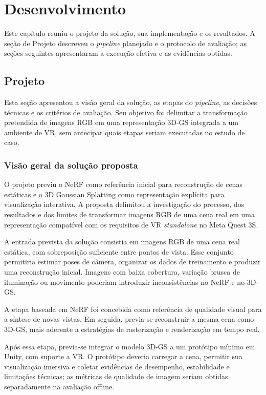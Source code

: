 \chapter[Desenvolvimento]{Desenvolvimento}

Este capítulo reuniu o projeto da solução, sua implementação e os resultados. A seção de Projeto descreveu o \textit{pipeline} planejado e o protocolo de avaliação; as seções seguintes apresentaram a execução efetiva e as evidências obtidas.

\section{Projeto}

Esta seção apresentou a visão geral da solução, as etapas do \textit{pipeline}, as decisões técnicas e os critérios de avaliação. Seu objetivo foi delimitar a transformação pretendida de imagens RGB em uma representação 3D-GS integrada a um ambiente de VR, sem antecipar quais etapas seriam executadas no estudo de caso.

\subsection{Visão geral da solução proposta}

O projeto previu o NeRF como referência inicial para reconstrução de cenas estáticas e o 3D Gaussian Splatting como representação explícita para visualização interativa. A proposta delimitou a investigação do processo, dos resultados e dos limites de transformar imagens RGB de uma cena real em uma representação compatível com os requisitos de VR \textit{standalone} no Meta Quest 3S.

A entrada prevista da solução consistia em imagens RGB de uma cena real estática, com sobreposição suficiente entre pontos de vista. Esse conjunto permitiria estimar poses de câmera, organizar os dados de treinamento e produzir uma reconstrução inicial. Imagens com baixa cobertura, variação brusca de iluminação ou movimento poderiam introduzir inconsistências no NeRF e no 3D-GS.

A etapa baseada em NeRF foi concebida como referência de qualidade visual para a síntese de novas vistas. Em seguida, previa-se reconstruir a mesma cena como 3D-GS, mais aderente a estratégias de rasterização e renderização em tempo real.

Após essa etapa, previa-se integrar o modelo 3D-GS a um protótipo mínimo em Unity, com suporte a VR. O protótipo deveria carregar a cena, permitir sua visualização imersiva e coletar evidências de desempenho, estabilidade e limitações técnicas; as métricas de qualidade de imagem seriam obtidas separadamente na avaliação offline.

